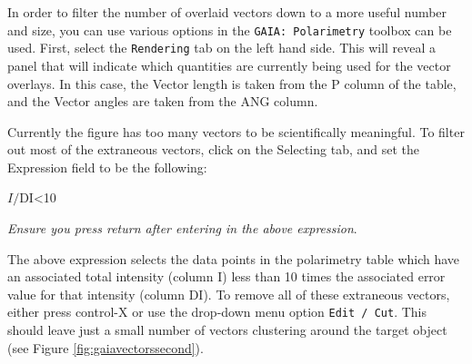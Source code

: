 In order to filter the number of overlaid vectors down to a more
useful number and size, you can use various options in the
\texttt{GAIA: Polarimetry} toolbox can be used. First, select the
\texttt{Rendering} tab on the
left hand side. This will reveal a panel that will indicate which
quantities are currently being used for the vector overlays. In this
case, the Vector length is taken from the P column of the table, and
the Vector angles are taken from the ANG column.

Currently the figure has too many vectors to be scientifically
meaningful. To filter out most of the extraneous vectors, click on the
Selecting tab, and set the Expression field to be the following:

\begin{terminalv}
$I/$DI<10
\end{terminalv}

\emph{Ensure you press return after entering in the above expression}.

The above expression selects the data points in the polarimetry table
which have an associated total intensity (column I) less than 10 times
the associated error value for that intensity (column DI). To remove
all of these extraneous vectors, either press control-X or use the
drop-down menu option \texttt{Edit / Cut}.  This should leave just a
small number of vectors clustering around the target object (see
Figure \ref{fig:gaiavectorssecond}).

